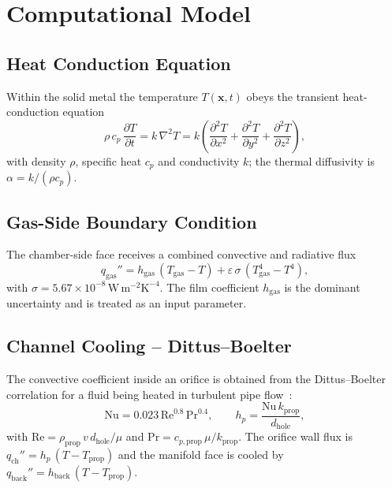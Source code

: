 \documentclass[11pt,a4paper]{article}
\begin{document}
\section{Computational Model}
\subsection{Heat Conduction Equation}
Within the solid metal the temperature $T(\mathbf{x},t)$ obeys the transient
heat-conduction equation
\begin{equation}
  \rho\,c_p\,\frac{\partial T}{\partial t}
  = k\,\nabla^2 T
  = k\!\left(\frac{\partial^2 T}{\partial x^2}
            +\frac{\partial^2 T}{\partial y^2}
            +\frac{\partial^2 T}{\partial z^2}\right),
  \label{eq:heat}
\end{equation}
with density $\rho$, specific heat $c_p$ and conductivity $k$; the thermal
diffusivity is $\alpha=k/(\rho c_p)$.

\subsection{Gas-Side Boundary Condition}
The chamber-side face receives a combined convective and radiative flux
\begin{equation}
  q_\mathrm{gas}'' = h_\mathrm{gas}\,(T_\mathrm{gas}-T)
    + \varepsilon\,\sigma\,(T_\mathrm{gas}^4 - T^4),
  \label{eq:gas}
\end{equation}
with $\sigma=5.67\times10^{-8}\,\mathrm{W\,m^{-2}K^{-4}}$. The film coefficient
$h_\mathrm{gas}$ is the dominant uncertainty and is treated as an input
parameter.

\subsection{Channel Cooling -- Dittus--Boelter}
The convective coefficient inside an orifice is obtained from the
Dittus--Boelter correlation for a fluid being heated in turbulent pipe
flow~\cite{incropera}:
\begin{equation}
  \mathrm{Nu} = 0.023\,\mathrm{Re}^{0.8}\,\mathrm{Pr}^{0.4},
  \qquad
  h_p = \frac{\mathrm{Nu}\,k_\mathrm{prop}}{d_\mathrm{hole}},
  \label{eq:db}
\end{equation}
with $\mathrm{Re}=\rho_\mathrm{prop}\,v\,d_\mathrm{hole}/\mu$ and
$\mathrm{Pr}=c_{p,\mathrm{prop}}\,\mu/k_\mathrm{prop}$. The orifice wall flux is
$q_\mathrm{ch}'' = h_p\,(T - T_\mathrm{prop})$ and the manifold face is cooled by
$q_\mathrm{back}'' = h_\mathrm{back}\,(T - T_\mathrm{prop})$.
\end{document}
